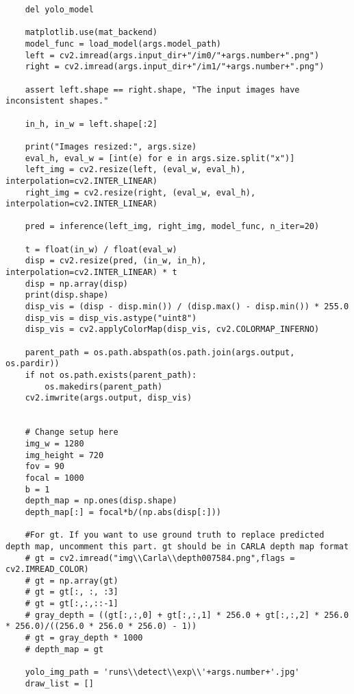 \begin{verbatim}
    del yolo_model

    matplotlib.use(mat_backend)
    model_func = load_model(args.model_path)
    left = cv2.imread(args.input_dir+"/im0/"+args.number+".png")
    right = cv2.imread(args.input_dir+"/im1/"+args.number+".png")

    assert left.shape == right.shape, "The input images have inconsistent shapes."

    in_h, in_w = left.shape[:2]

    print("Images resized:", args.size)
    eval_h, eval_w = [int(e) for e in args.size.split("x")]
    left_img = cv2.resize(left, (eval_w, eval_h), interpolation=cv2.INTER_LINEAR)
    right_img = cv2.resize(right, (eval_w, eval_h), interpolation=cv2.INTER_LINEAR)

    pred = inference(left_img, right_img, model_func, n_iter=20)

    t = float(in_w) / float(eval_w)
    disp = cv2.resize(pred, (in_w, in_h), interpolation=cv2.INTER_LINEAR) * t
    disp = np.array(disp)
    print(disp.shape)
    disp_vis = (disp - disp.min()) / (disp.max() - disp.min()) * 255.0
    disp_vis = disp_vis.astype("uint8")
    disp_vis = cv2.applyColorMap(disp_vis, cv2.COLORMAP_INFERNO)

    parent_path = os.path.abspath(os.path.join(args.output, os.pardir))
    if not os.path.exists(parent_path):
        os.makedirs(parent_path)
    cv2.imwrite(args.output, disp_vis)


    # Change setup here
    img_w = 1280
    img_height = 720
    fov = 90
    focal = 1000
    b = 1
    depth_map = np.ones(disp.shape)
    depth_map[:] = focal*b/(np.abs(disp[:]))

    #For gt. If you want to use ground truth to replace predicted depth map, uncomment this part. gt should be in CARLA depth map format
    # gt = cv2.imread("img\\Carla\\depth007584.png",flags = cv2.IMREAD_COLOR)
    # gt = np.array(gt)
    # gt = gt[:, :, :3]
    # gt = gt[:,:,::-1]
    # gray_depth = ((gt[:,:,0] + gt[:,:,1] * 256.0 + gt[:,:,2] * 256.0 * 256.0)/((256.0 * 256.0 * 256.0) - 1))
    # gt = gray_depth * 1000
    # depth_map = gt

    yolo_img_path = 'runs\\detect\\exp\\'+args.number+'.jpg'
    draw_list = []


\end{verbatim}
